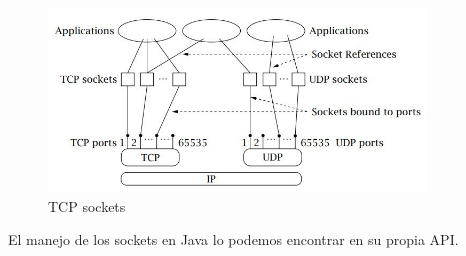 \documentclass[a4paper,11pt]{book}
\begin{document}
				 \begin{figure}[hbtp]
				 \centering
				 \includegraphics[width = 10cm]{FIGURAS/Explica_Sockets.JPG}
				 \caption{TCP sockets}
				 \end{figure}
				 \label{sockets}	
				 
		El manejo de los sockets en Java lo podemos encontrar en su propia API. 
\end{document}
